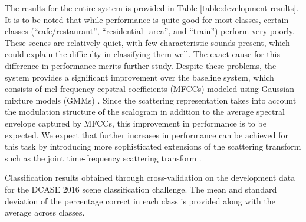 \documentclass{article}
\begin{document}
\begin{sloppy}
The results for the entire system is provided in Table \ref{table:development-results}. It is to be noted that while performance is quite good for most classes, certain classes (``cafe/restaurant'', ``residential\_area'', and ``train'') perform very poorly. These scenes are relatively quiet, with few characteristic sounds present, which could explain the difficulty in classifying them well. The exact cause for this difference in performance merits further study. Despite these problems, the system provides a significant improvement over the baseline system, which consists of mel-frequency cepstral coefficients (MFCCs) modeled using Gaussian mixture models (GMMs) \cite{heittola}. Since the scattering representation takes into account the modulation structure of the scalogram in addition to the average spectral envelope captured by MFCCs, this improvement in performance is to be expected. We expect that further increases in performance can be achieved for this task by introducing more sophisticated extensions of the scattering transform such as the joint time-frequency scattering transform \cite{joint}.

\begin{table}[!htbp]
\begin{center}

\end{center}
\caption{\label{table:development-results} Classification results obtained through cross-validation on the development data for the DCASE 2016 scene classification challenge. The mean and standard deviation of the percentage correct in each class is provided along with the average across classes.}
\end{table}




\end{sloppy}
\end{document}
